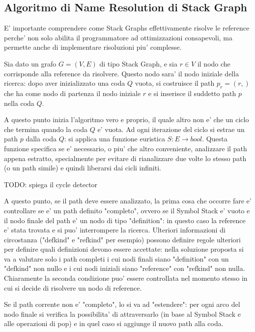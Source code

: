 \subsection{Algoritmo di Name Resolution di Stack Graph}

E' importante comprendere come Stack Graphs effettivamente risolve le reference perche' non solo abilita il programmatore ad ottimizzazioni consapevoli, ma permette anche di implementare risoluzioni piu' complesse.

\par
Sia dato un grafo $G = (V, E)$ di tipo Stack Graph, e sia $r \in V$ il nodo che corrisponde alla reference da risolvere. Questo nodo sara' il nodo iniziale della ricerca: dopo aver inizializzato una coda $Q$ vuota, si costruisce il path $p_r = (r,)$ che ha come nodo di partenza il nodo iniziale $r$ e si inserisce il suddetto path $p$ nella coda $Q$.

\par
A questo punto inizia l'algoritmo vero e proprio, il quale altro non e' che un ciclo che termina quando la coda $Q$ e' vuota.
Ad ogni iterazione del ciclo si estrae un path $p$ dalla coda $Q$: si applica una funzione euristica $S : E \rightarrow bool$.
Questa funzione specifica se e' necessario, o piu' che altro conveniente, analizzare il path appena estratto, specialmente per evitare di rianalizzare due volte lo stesso path (o un path simile) e quindi liberarsi dai cicli infiniti.

TODO: spiega il cycle detector

\par
A questo punto, se il path deve essere analizzato, la prima cosa che occorre fare e' controllare se e' un path definito "completo", ovvero se il Symbol Stack e' vuoto e il nodo finale del path e' un nodo di tipo "definition": in questo caso la reference e' stata trovata e si puo' interrompere la ricerca.
Ulteriori informazioni di circostanza ("defkind" e "refkind" per esempio) possono definire regole ulteriori per definire quali definizioni devono essere accettate: nella soluzione proposta si va a valutare solo i path completi i cui nodi finali siano "definition" con un "defkind" non nullo e i cui nodi iniziali siano "reference" con "refkind" non nulla. Chiaramente la seconda condizione puo' essere controllata nel momento stesso in cui si decide di risolvere un nodo di reference.

\par
Se il path corrente non e' "completo", lo si va ad "estendere": per ogni arco del nodo finale si verifica la possibilita' di attraversarlo (in base al Symbol Stack e alle operazioni di pop) e in quel caso si aggiunge il nuovo path alla coda.

